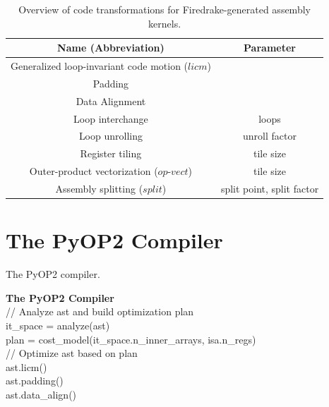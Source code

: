 \documentclass[conference]{IEEEtran}
\begin{document}
\begin{table}[h]
\caption{Overview of code transformations for Firedrake-generated assembly kernels.}
\label{table:code-transformations}
\begin{center}
\begin{tabulary}{1.0\columnwidth}{|C|C|}
\hline
Name (Abbreviation) & Parameter \\\hline\hline
Generalized loop-invariant code motion ($licm$) &   \\ \hline
Padding &  \\ \hline
Data Alignment & \\ \hline
Loop interchange      & loops  \\ \hline
Loop unrolling  & unroll factor \\ \hline
Register tiling & tile size \\ \hline
Outer-product vectorization ($op$-$vect$) & tile size \\ \hline
Assembly splitting ($split$) & split point, split factor \\ \hline
\end{tabulary}
\end{center}
\end{table}


\section{The PyOP2 Compiler}
\label{sec:pyop2-compiler}

\begin{algorithm}[t]
\caption{The PyOP2 compiler.}
\label{algo:PyOP2Compiler}
  \textbf{The PyOP2 Compiler}\\
// Analyze ast and build optimization plan \\
it\_space = analyze(ast) \\
plan = cost\_model(it\_space.n\_inner\_arrays, isa.n\_regs) \\
// Optimize ast based on plan \\
ast.licm() \\
ast.padding() \\
ast.data\_align() \\
\end{algorithm}
\end{document}
